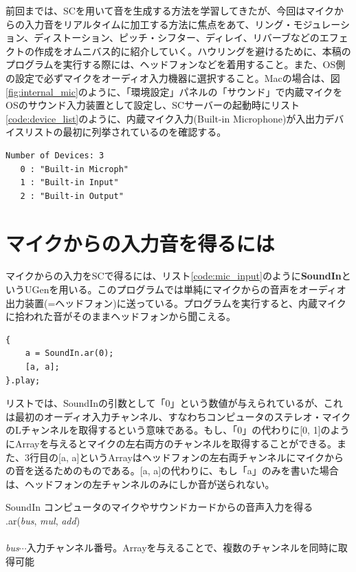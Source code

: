 \documentclass{jsarticle}
\begin{document}
\begin{figure}

\end{figure}
前回までは、SCを用いて音を生成する方法を学習してきたが、今回はマイクからの入力音をリアルタイムに加工する方法に焦点をあて、リング・モジュレーション、ディストーション、ピッチ・シフター、ディレイ、リバーブなどのエフェクトの作成をオムニバス的に紹介していく。ハウリングを避けるために、本稿のプログラムを実行する際には、ヘッドフォンなどを着用すること。また、OS側の設定で必ずマイクをオーディオ入力機器に選択すること。Macの場合は、図\ref{fig:internal_mic}のように、「環境設定」パネルの「サウンド」で内蔵マイクをOSのサウンド入力装置として設定し、SCサーバーの起動時にリスト\ref{code:device_list}のように、内蔵マイク入力(Built-in Microphone)が入出力デバイスリストの最初に列挙されているのを確認する。

\begin{lstlisting}[caption=入出力デバイスのリスト,label=code:device_list]
Number of Devices: 3
   0 : "Built-in Microph"
   1 : "Built-in Input"
   2 : "Built-in Output"
\end{lstlisting}

\section{マイクからの入力音を得るには}
マイクからの入力をSCで得るには、リスト\ref{code:mic_input}のように{\bf SoundIn}というUGenを用いる。このプログラムでは単純にマイクからの音声をオーディオ出力装置(=ヘッドフォン)に送っている。プログラムを実行すると、内蔵マイクに拾われた音がそのままヘッドフォンから聞こえる。

\begin{lstlisting}[caption=マイク入力,label=code:mic_input]
{
	a = SoundIn.ar(0);
	[a, a];
}.play;
\end{lstlisting}

リストでは、SoundInの引数として「0」という数値が与えられているが、これは最初のオーディオ入力チャンネル、すなわちコンピュータのステレオ・マイクのLチャンネルを取得するという意味である。もし、「0」の代わりに[0, 1]のようにArrayを与えるとマイクの左右両方のチャンネルを取得することができる。また、3行目の[a, a]というArrayはヘッドフォンの左右両チャンネルにマイクからの音を送るためのものである。[a, a]の代わりに、もし「a」のみを書いた場合は、ヘッドフォンの左チャンネルのみにしか音が送られない。
\begin{itembox}[l]{SoundIn}
{\footnotesize 
コンピュータのマイクやサウンドカードからの音声入力を得る\\
.ar({\it bus}, {\it mul}, {\it add})\\\\
{\it bus}$\cdots$入力チャンネル番号。Arrayを与えることで、複数のチャンネルを同時に取得可能\\
}
\end{itembox}
\end{document}
